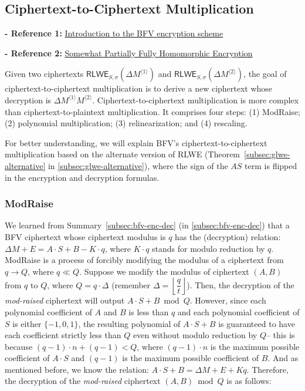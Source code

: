 \subsection{Ciphertext-to-Ciphertext Multiplication}
\label{subsec:bfv-mult-cipher}

\noindent \textbf{- Reference 1:} 
\href{https://www.inferati.com/blog/fhe-schemes-bfv}{Introduction to the BFV encryption scheme}~\cite{inferati-bfv}

\noindent \textbf{- Reference 2:} 
\href{https://eprint.iacr.org/2012/144.pdf}{Somewhat Partially Fully Homomorphic Encryption}~\cite{cryptoeprint:2012/144}



Given two ciphertexts $\textsf{RLWE}_{S, \sigma}(\Delta M^{\langle 1\rangle })$ and $\textsf{RLWE}_{S, \sigma}(\Delta M^{\langle 2\rangle})$, the goal of ciphertext-to-ciphertext multiplication is to derive a new ciphertext whose decryption is $\Delta M^{\langle 1 \rangle} M^{\langle 2 \rangle}$. Ciphertext-to-ciphertext multiplication is more complex than ciphertext-to-plaintext multiplication. It comprises four steps: (1) \textsf{ModRaise}; (2) polynomial multiplication; (3) relinearization; and (4) rescaling. 

For better understanding, we will explain BFV's ciphertext-to-ciphertext multiplication based on the alternate version of RLWE (Theorem~\ref*{subsec:glwe-alternative} in \autoref{subsec:glwe-alternative}), where the sign of the $AS$ term is flipped in the encryption and decryption formulas.

\subsubsection{\textsf{ModRaise}}
\label{subsubsec:bfv-mult-cipher-modraise}

We learned from Summary~\ref*{subsec:bfv-enc-dec} (in \autoref{subsec:bfv-enc-dec}) that a BFV ciphertext whose ciphertext modulus is $q$ has the (decryption) relation: $\Delta M + E = A\cdot S + B - K \cdot q$, where $K \cdot q$ stands for modulo reduction by $q$. \textsf{ModRaise} is a process of forcibly modifying the modulus of a ciphertext from $q \rightarrow Q$, where $q \ll Q$. Suppose we modify the modulus of ciphertext $(A, B)$ from $q$ to $Q$, where $Q = q \cdot \Delta$ (remember $\Delta = \left\lfloor\dfrac{q}{t}\right\rfloor$). Then, the decryption of the \textit{mod-raised} ciphertext will output $A\cdot S + B \bmod Q$. However, since each polynomial coefficient of $A$ and $B$ is less than $q$ and each polynomial coefficient of $S$ is either $\{-1, 0, 1\}$, the resulting polynomial of $A\cdot S + B$ is guaranteed to have each coefficient strictly less than $Q$ even without modulo reduction by $Q$-- this is because $(q-1)\cdot n + (q-1) < Q$, where $(q-1)\cdot n$ is the maximum possible coefficient of $A \cdot S$ and $(q-1)$ is the maximum possible coefficient of $B$. And as mentioned before, we know the relation: $A\cdot S + B = \Delta M + E + Kq$. Therefore, the decryption of the \textit{mod-raised} ciphertext $(A, B) \bmod Q$ is as follows:

